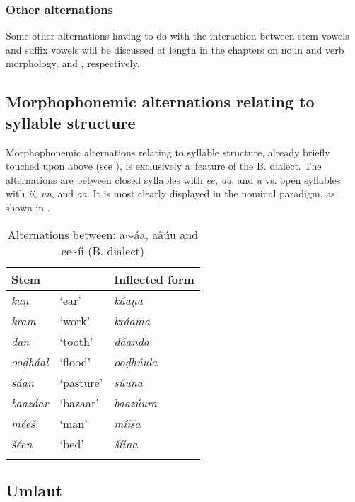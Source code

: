 \subsubsection*{Other alternations}

Some other alternations having to do with the interaction between stem vowels and suffix vowels will
be discussed at length in the chapters on noun and verb morphology,  and
, respectively.

\subsection{Morphophonemic alternations relating to syllable structure}
\label{subsec:3-5-2}


Morphophonemic alternations relating to syllable structure, already briefly touched upon above (see ), is exclusively a~feature of the B. dialect. The alternations are between closed syllables with \textit{ee, aa}, and \textit{a} vs. open syllables with \textit{ii, uu}, and \textit{aa}. It is most clearly displayed in the nominal paradigm, as shown in .



\begin{table}[ht]
\caption{Alternations between: a$\sim$áa, aãúu and ee\~{}íi (B. dialect)}
\begin{tabularx}{\textwidth}{ Q Q Q }
\lsptoprule
Stem &
&
Inflected form\\\hline
\textit{kaṇ} &
`ear' &
\textit{káaṇa} \\
\textit{kram} &
`work' &
\textit{kráama} \\
\textit{dan} &
`tooth' &
\textit{dáanda} \\
\textit{ooḍháal} &
`flood' &
\textit{ooḍhúula} \\
\textit{sáan} &
`pasture' &
\textit{súuna} \\
\textit{baazáar} &
`bazaar' &
\textit{baazúura} \\
\textit{méeš} &
`man' &
\textit{míiša} \\
\textit{šéen} &
`bed' &
\textit{šíina} \\\lspbottomrule
\end{tabularx}
\label{tab:3-15}
\end{table}

\subsection{Umlaut}
\label{subsec:3-5-3}

